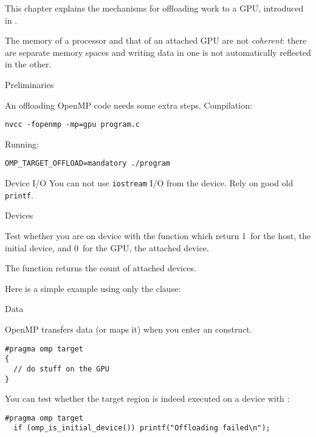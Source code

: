 
This chapter explains the mechanisms for offloading work to a \acf{GPU},
introduced in .

The memory of a processor and that of an attached \ac{GPU} are not
\emph{coherent}:
there are separate memory spaces and writing data in one
is not automatically reflected in the other.

 {Preliminaries}

An offloading OpenMP code needs some extra steps.
Compilation:
\begin{lstlisting}
nvcc -fopenmp -mp=gpu program.c
\end{lstlisting}
Running:
\begin{lstlisting}
OMP_TARGET_OFFLOAD=mandatory ./program
\end{lstlisting}

\begin{cppnote}{Device I/O}
  You can not use \lstinline{iostream} I/O from the device.
  Rely on good old \lstinline{printf}.
\end{cppnote}

 {Devices}

Test whether you are on device with the function 
which return 1~for the host, the initial device, and 0~for the \ac{GPU},
the attached device.

The function  returns the count
of attached devices.

Here is a simple example using only the  clause:

 {Data}

OpenMP transfers data (or maps it) when you enter an 
construct.
\begin{lstlisting}[language=omp]
#pragma omp target
{
  // do stuff on the GPU
}
\end{lstlisting}

You can test whether the target region is indeed executed on a device
with :
\begin{lstlisting}[language=omp]
#pragma omp target
  if (omp_is_initial_device()) printf("Offloading failed\n");
\end{lstlisting}


